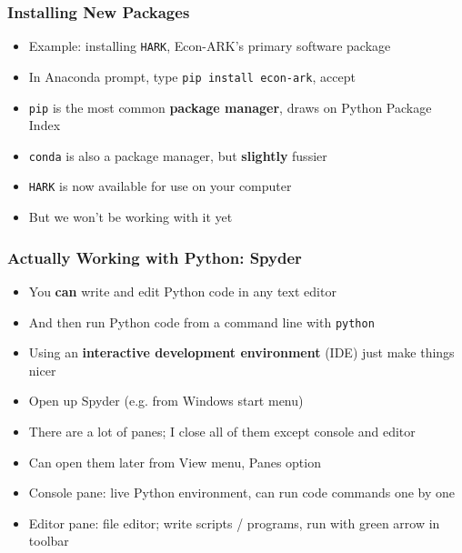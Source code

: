 \documentclass[aspectratio=169]{beamer}
\begin{document}

\begin{frame}
\frametitle{Installing New Packages}
\begin{itemize}
	\item Example: installing \texttt{HARK}, Econ-ARK's primary software package
	
	\item In Anaconda prompt, type \texttt{pip install econ-ark}, accept
	
	\item <2->\texttt{pip} is the most common \textbf{package manager}, draws on Python Package Index
	
	\item <2->\texttt{conda} is also a package manager, but \textbf{slightly} fussier
	
	\item <3->\texttt{HARK} is now available for use on your computer
	
	\item <3->But we won't be working with it yet
\end{itemize}
\end{frame}


\begin{frame}
\frametitle{Actually Working with Python: Spyder}
\begin{itemize}
	\item You \textbf{can} write and edit Python code in any text editor
	
	\item And then run Python code from a command line with \texttt{python}
	
	\item <2->Using an \textbf{interactive development environment} (IDE) just make things nicer
	
	\item <2->Open up Spyder (e.g. from Windows start menu)
	
	\item <3->There are a lot of panes; I close all of them except console and editor
	
	\item <3->Can open them later from View menu, Panes option
	
	\item <4->Console pane: live Python environment, can run code commands one by one
	
	\item <4->Editor pane: file editor; write scripts / programs, run with green arrow in toolbar
\end{itemize}
\end{frame}
\end{document}
